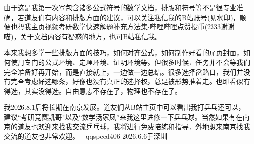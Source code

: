 \documentclass[12pt]{report}
\begin{document}
     由于这是我第一次写包含诸多公式符号的数学文档，排版和符号等不是很专业准确，若道友们有内容和排版方面的建议，可以关注私信我的B站账号(见水印)，顺便也帮我主页视频\href{https://b23.tv/R8F4RW5}{考研数学快速解题补充方法集-哔哩哔哩}点赞投币(2333谢谢喵)，关于文档内容有疑惑的地方，也可B站私信我。
     
     本来我想多学一些排版方面的技巧，如何对齐公式，如何制作好看的扉页封面，如何使用专门的公式环境、定理环境、证明环境等。但很多时候，任务并不会等我们完全准备好再开始，而是直接就上，一边做一边总结。很多选择岔路口，我们并没有完全考虑好选哪条，好像也没有真正的选择权，总是被形势推着走。也即看似有得选，其实没得选。自由意志不存在了，物理也不存在了。
     
     我2026.8.1后将长期在南京发展。道友们从B站主页中可以看出我打乒乓还可以，建议“考研竞赛凯哥”以及“数学汤家凤”来我这里进修一下乒乓球。当然如果有在南京的道友也欢迎来找我交流乒乓球，我将进行免费陪练和指导，外地想来南京找我交流的道友也非常欢迎。\hspace{2em}—qqspeed406 \hspace{1em}2026.6.6于深圳
     
	
\end{document}
